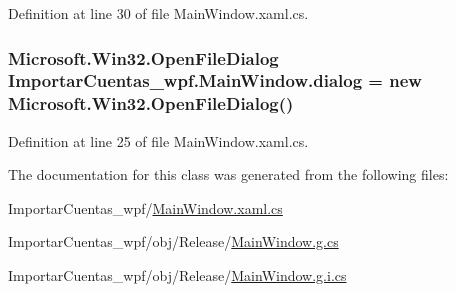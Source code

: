 Definition at line 30 of file Main\-Window.\-xaml.\-cs.

\hypertarget{class_importar_cuentas__wpf_1_1_main_window_ac1846e4ecd501ff338ad87a7c7bcb254}{
\subsubsection[{dialog}]{\setlength{\rightskip}{0pt plus 5cm}Microsoft.\-Win32.\-Open\-File\-Dialog Importar\-Cuentas\-\_\-wpf.\-Main\-Window.\-dialog = new Microsoft.\-Win32.\-Open\-File\-Dialog()\hspace{0.3cm}{\ttfamily [private]}}}\label{class_importar_cuentas__wpf_1_1_main_window_ac1846e4ecd501ff338ad87a7c7bcb254}


Definition at line 25 of file Main\-Window.\-xaml.\-cs.



The documentation for this class was generated from the following files\-:\begin{DoxyCompactItemize}
\item 
Importar\-Cuentas\-\_\-wpf/\hyperlink{_importar_cuentas__wpf_2_main_window_8xaml_8cs}{Main\-Window.\-xaml.\-cs}\item 
Importar\-Cuentas\-\_\-wpf/obj/\-Release/\hyperlink{_importar_cuentas__wpf_2obj_2_release_2_main_window_8g_8cs}{Main\-Window.\-g.\-cs}\item 
Importar\-Cuentas\-\_\-wpf/obj/\-Release/\hyperlink{_importar_cuentas__wpf_2obj_2_release_2_main_window_8g_8i_8cs}{Main\-Window.\-g.\-i.\-cs}\end{DoxyCompactItemize}
